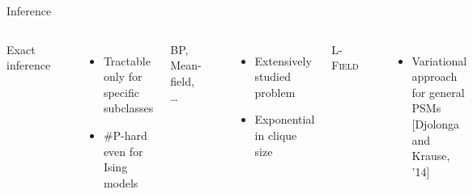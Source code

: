 \documentclass[mathserif]{beamer}
\newcommand{\qcite}[1]{{\scriptsize\color{col2}[#1]}}
\begin{document}
\begin{frame}{Inference}
\vspace{0.5em}
\begin{columns}[c]
\begin{minipage}[t][1.7em]{\textwidth}
\centering
Exact inference
\end{minipage}

\centering
\includegraphics[width=1.4in]{figures/inf01_exact.pdf}

\vspace{1em}
\begin{itemize}
\item \small{Tractable only for specific subclasses}
\vspace{1em}
\item \#P-hard even for Ising models
\end{itemize}

\begin{minipage}[t][1.7em]{\textwidth}
\centering
BP, Mean-field, \ldots
\end{minipage}

\centering
\includegraphics[width=1.4in]{figures/inf02_loworder.pdf}

\vspace{1em}
\begin{itemize}
\item \small{Extensively studied problem}
\vspace{1em}
\item \small{Exponential in clique size}
\end{itemize}

\begin{minipage}[t][1.7em]{\textwidth}
\centering
L-\textsc{Field}
\end{minipage}

\centering
\includegraphics[width=1.4in]{figures/inf03_psm.pdf}

\vspace{1em}
\begin{itemize}
\item \small{Variational approach for general PSMs} \qcite{Djolonga and Krause, '14}
\vspace{1.2em}
\end{itemize}
\end{columns}
\end{frame}
\end{document}
